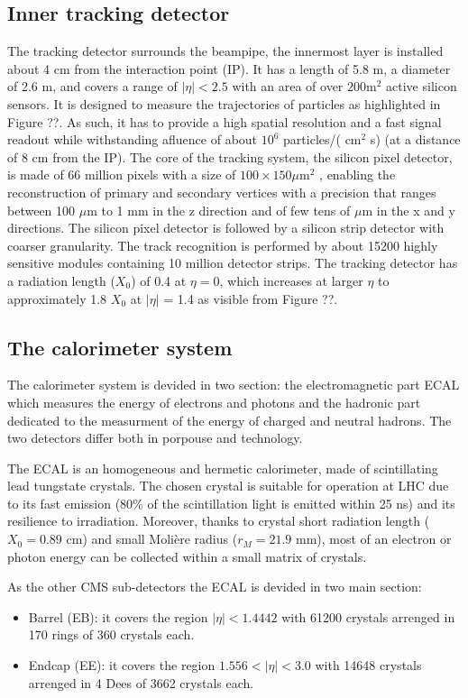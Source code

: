 \subsection{Inner tracking detector}
The tracking detector surrounds the beampipe, the innermost layer is installed
about 4 cm from the interaction point (IP). It has a length of 5.8 m, a diameter of 2.6 m,
and covers a range of $|\eta| < 2.5$ with an area of over $200$m$^{2}$ active silicon sensors. It is
designed to measure the trajectories of particles as highlighted in Figure ??. As such,
it has to provide a high spatial resolution and a fast signal readout while withstanding afluence
of about $10^6$ particles/( cm$^2$ s) (at a distance of 8 cm from
the IP).
The core of the tracking system, the silicon pixel detector, is made of 66 million pixels
with a size of $100 \times 150 \mu$m$^2$ , enabling the reconstruction of primary and secondary
vertices with a precision that ranges between 100 $\mu$m to 1 mm in the z direction and of few tens of $\mu$m
in the x and y directions. The silicon pixel detector is followed by a silicon strip detector with coarser
granularity. The track recognition is performed by about 15200 highly sensitive
modules containing 10 million detector strips. The tracking detector has a radiation length ($X_0$) of 0.4 at $\eta = 0$,
which increases at larger $\eta$ to approximately 1.8 $X_0$ at $|\eta|$ = 1.4 as visible from Figure ??.

\subsection{The calorimeter system}
\label{sec:cms_calo}
The calorimeter system is devided in two section: the electromagnetic part ECAL which measures the energy
of electrons and photons and the hadronic part dedicated to the measurment of the energy of charged and
neutral hadrons. The two detectors differ both in porpouse and technology.

The ECAL is an homogeneous and hermetic calorimeter, made of scintillating lead tungstate
crystals. The chosen crystal is suitable for operation at LHC due to its fast emission
(80\% of the scintillation light is emitted within 25 ns) and its resilience to irradiation. Moreover,
thanks to crystal short radiation length ($X_0 = 0.89$ cm) and small Molière radius ($r_M = 21.9$
mm), most of an electron or photon energy can be collected within a small matrix of crystals.

As the other CMS sub-detectors the ECAL is devided in two main section:
\begin{itemize}%
\item Barrel (EB): it covers the region $|\eta| < 1.4442$ with 61200 crystals arrenged in 170 rings of 360 crystals each.
\item Endcap (EE): it covers the region $1.556 < |\eta| < 3.0$ with 14648 crystals arrenged in 4 Dees of 3662 crystals each.
\end{itemize}

